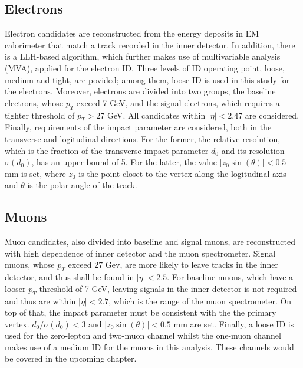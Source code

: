 \documentclass[class=NCU_thesis, crop=false]{standalone}
\begin{document}
	\subsection{Electrons}
		Electron candidates are reconstructed from the energy deposits in EM calorimeter that match a track recorded in the inner detector. In addition, there is a LLH-based algorithm, which further makes use of multivariable analysis (MVA), applied for the electron ID. Three levels of ID operating point, loose, medium and tight, are povided; among them, loose ID is used in this study for the electrons. Moreover, electrons are divided into two groups, the baseline electrons, whose $p_T$ exceed 7 GeV, and the signal electrons, which requires a tighter threshold of $p_T > 27$ GeV. All candidates within $\lvert \eta \rvert < 2.47$ are considered. Finally, requirements of the impact parameter are considered, both in the transverse and logitudinal directions. For the former, the relative resolution, which is the fraction of the transverse impact parameter $d_0$ and its resolution $\sigma(d_0)$, has an upper bound of 5. For the latter, the value $\lvert z_0 \sin(\theta) \rvert < 0.5$ mm is set, where $z_0$ is the point closet to the vertex along the logitudinal axis and $\theta$ is the polar angle of the track.
		
	\subsection{Muons}
		Muon candidates, also divided into baseline and signal muons, are reconstructed with high dependence of inner detector and the muon spectrometer. Signal muons, whose $p_T$ exceed 27 Gev, are more likely to leave tracks in the inner detector, and thus shall be found in $\lvert \eta \rvert < 2.5$. For baseline muons, which have a looser $p_T$ threshold of 7 GeV, leaving signals in the inner detector is not required and thus are within $\lvert \eta \rvert < 2.7$, which is the range of the muon spectrometer. On top of that, the impact parameter must be consistent with the the primary vertex. $d_0 / \sigma(d_0) < 3$ and $\lvert z_0 \sin(\theta) \rvert < 0.5$ mm are set. Finally, a loose ID is used for the zero-lepton and two-muon channel whilst the one-muon channel makes use of a medium ID for the muons in this analysis. These channels would be covered in the upcoming chapter.
		
\end{document}
